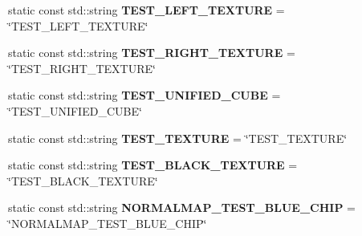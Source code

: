 \begin{DoxyCompactItemize}
\item 
\mbox{\label{struct_geometry_engine_1_1_geometry_material_1_1_texture_constant_a14d17c2dd6125effc0109ac404df9741}} 
static const std\+::string {\bfseries T\+E\+S\+T\+\_\+\+L\+E\+F\+T\+\_\+\+T\+E\+X\+T\+U\+RE} = \char`\"{}T\+E\+S\+T\+\_\+\+L\+E\+F\+T\+\_\+\+T\+E\+X\+T\+U\+RE\char`\"{}
\item 
\mbox{\label{struct_geometry_engine_1_1_geometry_material_1_1_texture_constant_ac18fed20edf867ce13ccd3cb3cde43cd}} 
static const std\+::string {\bfseries T\+E\+S\+T\+\_\+\+R\+I\+G\+H\+T\+\_\+\+T\+E\+X\+T\+U\+RE} = \char`\"{}T\+E\+S\+T\+\_\+\+R\+I\+G\+H\+T\+\_\+\+T\+E\+X\+T\+U\+RE\char`\"{}
\item 
\mbox{\label{struct_geometry_engine_1_1_geometry_material_1_1_texture_constant_a133496f744e5c15fb2b2bed24b348f2d}} 
static const std\+::string {\bfseries T\+E\+S\+T\+\_\+\+U\+N\+I\+F\+I\+E\+D\+\_\+\+C\+U\+BE} = \char`\"{}T\+E\+S\+T\+\_\+\+U\+N\+I\+F\+I\+E\+D\+\_\+\+C\+U\+BE\char`\"{}
\item 
\mbox{\label{struct_geometry_engine_1_1_geometry_material_1_1_texture_constant_ac96667257b17fce30cf2a27785483bd7}} 
static const std\+::string {\bfseries T\+E\+S\+T\+\_\+\+T\+E\+X\+T\+U\+RE} = \char`\"{}T\+E\+S\+T\+\_\+\+T\+E\+X\+T\+U\+RE\char`\"{}
\item 
\mbox{\label{struct_geometry_engine_1_1_geometry_material_1_1_texture_constant_ac0676c7dcdd7639f65e6bd1cb2b67772}} 
static const std\+::string {\bfseries T\+E\+S\+T\+\_\+\+B\+L\+A\+C\+K\+\_\+\+T\+E\+X\+T\+U\+RE} = \char`\"{}T\+E\+S\+T\+\_\+\+B\+L\+A\+C\+K\+\_\+\+T\+E\+X\+T\+U\+RE\char`\"{}
\item 
\mbox{\label{struct_geometry_engine_1_1_geometry_material_1_1_texture_constant_a31aa79e8443d0d82bc58e302069248a6}} 
static const std\+::string {\bfseries N\+O\+R\+M\+A\+L\+M\+A\+P\+\_\+\+T\+E\+S\+T\+\_\+\+B\+L\+U\+E\+\_\+\+C\+H\+IP} = \char`\"{}N\+O\+R\+M\+A\+L\+M\+A\+P\+\_\+\+T\+E\+S\+T\+\_\+\+B\+L\+U\+E\+\_\+\+C\+H\+IP\char`\"{}

\end{DoxyCompactItemize}
